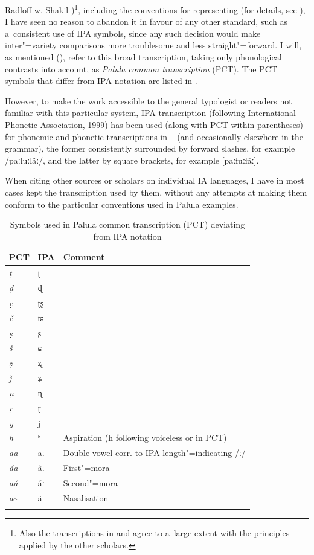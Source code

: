 {Radloff w. Shakil \citeyear{radloffshakil1998})\footnote{Also the transcriptions in
    \citet{hook1990a,hook1996} and \citet{hookzia2005} agree to a~large extent with the principles
    applied by the other scholars.}, including the conventions for representing  (for details,
  see ), I have seen no reason to abandon it in favour of any other standard, such as
  a~consistent use of IPA symbols, since any such decision would make inter"=variety comparisons more
  troublesome and less straight"=forward. I will, as mentioned (), refer to this broad transcription, taking only phonological contrasts into account, as \textit{Palula common transcription} (PCT). The PCT symbols that differ from IPA notation are listed in .


However, to make the work accessible to the general typologist or readers not familiar with this
particular system, IPA transcription (following International Phonetic Association, 1999) has been
used (along with PCT within parentheses) for phonemic and phonetic
transcriptions in -- (and occasionally elsewhere in the grammar), the former consistently surrounded by forward slashes, for example /paːluːlǎː/, and the latter by square brackets, for example [paːɫuːɫǎː]. 


When citing other sources or scholars on individual IA languages, I have in most cases kept the
transcription used by them, without any attempts at making them conform to the particular
conventions used in Palula examples.


\begin{table}[ht]
\caption{Symbols used in Palula common transcription (PCT) deviating from IPA notation}
\begin{tabularx}{.8\textwidth}{ l l   Q }
\lsptoprule
PCT &
IPA &
Comment\\\midrule
\textit{ṭ} &
ʈ &
\\
\textit{ḍ} &
ɖ &
\\
\textit{c̣} &
ʈʂ &
\\
\textit{č} &
ʨ &
\\
\textit{ṣ} &
ʂ &
\\
\textit{š} &
ɕ &
\\
\textit{ẓ} &
ʐ &
\\
\textit{ǰ} &
ʑ &\\


\textit{ṇ} &
ɳ &
\\
\textit{ṛ} &
ɽ &
\\
\textit{y} &
j &
\\
\textit{h} &
ʰ &
Aspiration (h following voiceless  or  in PCT)
\\
\textit{aa} &
aː &
Double vowel corr. to IPA length"=indicating /ː/
\\
\textit{áa} &
âː &
First"=mora 
\\
\textit{aá} &
ǎː &
Second"=mora 
\\
\textit{a}\textasciitilde &
ã &
Nasalisation\\\lspbottomrule
\end{tabularx}
\label{tab:1-5}
\end{table}

}
